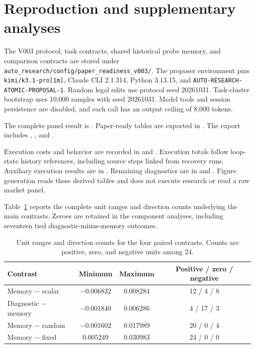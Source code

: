 \appendix
\section{Reproduction and supplementary analyses}
\label{app:reproduction}

The V003 protocol, task contracts, shared historical probe memory, and comparison contracts are stored under \texttt{auto\_research/config/paper\_readiness\_v003/}. The proposer environment pins \texttt{kimi/k3.1-pro[1m]}, Claude CLI 2.1.314, Python 3.13.15, and \texttt{AUTO-RESEARCH-ATOMIC-PROPOSAL-1}. Random legal edits use protocol seed 20261031. Task-cluster bootstrap uses 10{,}000 samples with seed 20261031. Model tools and session persistence are disabled, and each call has an output ceiling of 8{,}000 tokens.

The complete panel result is . Paper-ready tables are exported in . The export includes , , and .

Execution costs and behavior are recorded in  and . Execution totals follow loop-state history references, including source steps linked from recovery runs. Auxiliary execution results are in . Remaining diagnostics are in  and . Figure generation reads these derived tables and does not execute research or read a raw market panel.

Table~\ref{tab:ranges} reports the complete unit ranges and direction counts underlying the main contrasts. Zeroes are retained in the component analyses, including seventeen tied diagnostic-minus-memory outcomes.

\begin{table}[!htbp]
\caption{Unit ranges and direction counts for the four paired contrasts. Counts are positive, zero, and negative units among 24.}
\label{tab:ranges}
\centering
\ProjectCaption
\small
\begin{tabular}{lccc}
\toprule
Contrast & Minimum & Maximum & Positive / zero / negative \\
\midrule
Memory $-$ scalar & $-$0.006832 & 0.008284 & 12 / 4 / 8 \\
Diagnostic $-$ memory & $-$0.001840 & 0.006286 & 4 / 17 / 3 \\
Memory $-$ random & $-$0.001602 & 0.017989 & 20 / 0 / 4 \\
Memory $-$ fixed & 0.005249 & 0.030983 & 24 / 0 / 0 \\
\bottomrule
\end{tabular}
\end{table}

